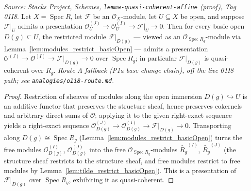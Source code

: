 \begin{lemma}
  \label{lem:presentation_restrict_basicOpen}
  \textit{Source: Stacks Project, Schemes, \texttt{lemma-quasi-coherent-affine} (proof),
  Tag 01I8.}
  Let \(X = \operatorname{Spec} R\), let \(\mathcal{F}\) be an \(\mathcal{O}_X\)-module, let
  \(U \subseteq X\) be open, and suppose \(\mathcal{F}|_U\) admits a presentation
  \(\mathcal{O}_U^{(J)} \to \mathcal{O}_U^{(I)} \to \mathcal{F}|_U \to 0\). Then for every
  basic open \(D(g) \subseteq U\), the restricted module
  \(\mathcal{F}|_{D(g)}\) — viewed as an \(\mathcal{O}_{\operatorname{Spec} R_g}\)-module via
  Lemma~\ref{lem:modules_restrict_basicOpen} — admits a presentation
  \(\mathcal{O}^{(J)} \to \mathcal{O}^{(I)} \to \mathcal{F}|_{D(g)} \to 0\) over
  \(\operatorname{Spec} R_g\); in particular \(\mathcal{F}|_{D(g)}\) is quasi-coherent over
  \(R_g\).
  \emph{Route-A fallback (P1a base-change chain), off the live 01I8 path; see
  \texttt{analogies/o1i8-route.md}.}
\end{lemma}
\begin{proof}
  Restriction of sheaves of modules along the open immersion
  \(D(g) \hookrightarrow U\) is an additive functor that preserves the structure sheaf, hence
  preserves cokernels and arbitrary direct sums of \(\mathcal{O}\); applying it to the given
  right-exact sequence yields a right-exact sequence
  \(\mathcal{O}_{D(g)}^{(J)} \to \mathcal{O}_{D(g)}^{(I)} \to \mathcal{F}|_{D(g)} \to 0\).
  Transporting along \(D(g) \cong \operatorname{Spec} R_g\)
  (Lemma~\ref{lem:modules_restrict_basicOpen}) turns the free modules
  \(\mathcal{O}_{D(g)}^{(I)}\), \(\mathcal{O}_{D(g)}^{(J)}\) into the free
  \(\mathcal{O}_{\operatorname{Spec} R_g}\)-modules \(\widetilde{R_g}^{(I)}\),
  \(\widetilde{R_g}^{(J)}\) (the structure sheaf restricts to the structure sheaf, and free
  modules restrict to free modules by Lemma~\ref{lem:tilde_restrict_basicOpen}). This is a
  presentation of \(\mathcal{F}|_{D(g)}\) over \(\operatorname{Spec} R_g\), exhibiting it as
  quasi-coherent.
\end{proof}

